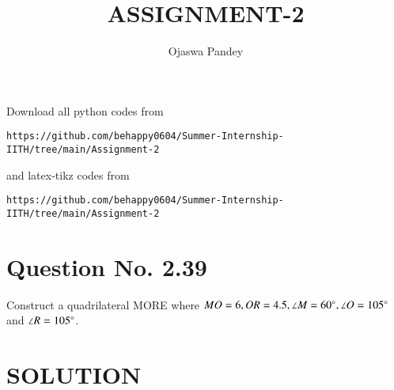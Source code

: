 \documentclass[journal,12pt,twocolumn]{IEEEtran}
\begin{document}
     \def\topbox#1{\raisebox{-\baselineskip}[0in][0in]{#1}}
     \def\midbox#1{\raisebox{-0.5\baselineskip}[0in][0in]{#1}}
\vspace{3cm}
\title{ASSIGNMENT-2}
\author{Ojaswa Pandey}
\maketitle
\newpage
\bigskip
\renewcommand{\thefigure}{\theenumi}
\renewcommand{\thetable}{\theenumi}
Download all python codes from 
\begin{lstlisting}
https://github.com/behappy0604/Summer-Internship-IITH/tree/main/Assignment-2
\end{lstlisting}
%
and latex-tikz codes from 
%
\begin{lstlisting}
https://github.com/behappy0604/Summer-Internship-IITH/tree/main/Assignment-2
\end{lstlisting}
%
\section{Question No. 2.39}
Construct a quadrilateral MORE where $MO = 6, OR = 4.5, \angle M = 60 \degree, \angle O = 105 \degree$ and $\angle R = 105 \degree$.
%
\section{SOLUTION}
\end{document}
